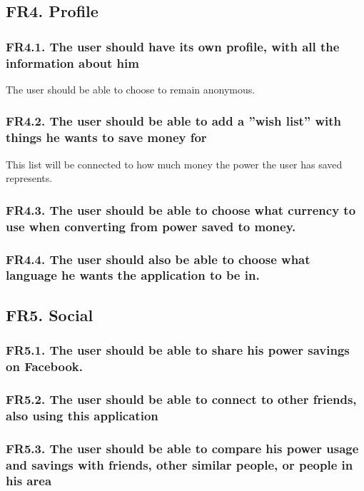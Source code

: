 \subsection{FR4. Profile}

\subsubsection{FR4.1. The user should have its own profile, with all the information about him}
The user should be able to choose to remain anonymous.

\subsubsection{FR4.2. The user should be able to add a ''wish list'' with things he wants to save money for}
This list will be connected to how much money the power the user has saved represents.

\subsubsection{FR4.3. The user should be able to choose what currency to use when converting from power saved to money.}

\subsubsection{FR4.4. The user should also be able to choose what language he wants the application to be in.}


\subsection{FR5. Social}
\subsubsection{FR5.1. The user should be able to share his power savings on Facebook.}

\subsubsection{FR5.2. The user should be able to connect to other friends, also using this application}

\subsubsection{FR5.3. The user should be able to compare his power usage and savings with friends, other similar people, or people in his area}

